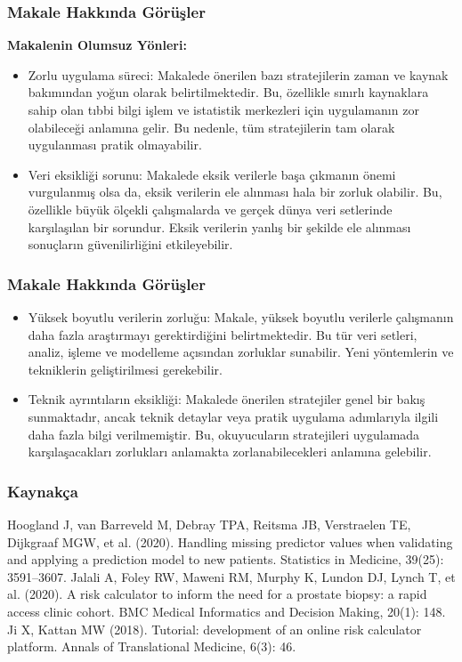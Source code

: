 \documentclass{beamer}
\begin{document}
\begin{frame}
\frametitle{Makale Hakkında Görüşler}
\textbf{Makalenin Olumsuz Yönleri:} 
\begin{itemize}
\item Zorlu uygulama süreci: Makalede önerilen bazı stratejilerin zaman ve kaynak bakımından yoğun olarak belirtilmektedir. Bu, özellikle sınırlı kaynaklara sahip olan tıbbi bilgi işlem ve istatistik merkezleri için uygulamanın zor olabileceği anlamına gelir. Bu nedenle, tüm stratejilerin tam olarak uygulanması pratik olmayabilir.
\item Veri eksikliği sorunu: Makalede eksik verilerle başa çıkmanın önemi vurgulanmış olsa da, eksik verilerin ele alınması hala bir zorluk olabilir. Bu, özellikle büyük ölçekli çalışmalarda ve gerçek dünya veri setlerinde karşılaşılan bir sorundur. Eksik verilerin yanlış bir şekilde ele alınması sonuçların güvenilirliğini etkileyebilir.
\end{itemize}

\end{frame}

\begin{frame}
\frametitle{Makale Hakkında Görüşler}
\begin{itemize}
\item Yüksek boyutlu verilerin zorluğu: Makale, yüksek boyutlu verilerle çalışmanın daha fazla araştırmayı gerektirdiğini belirtmektedir. Bu tür veri setleri, analiz, işleme ve modelleme açısından zorluklar sunabilir. Yeni yöntemlerin ve tekniklerin geliştirilmesi gerekebilir.
\item Teknik ayrıntıların eksikliği: Makalede önerilen stratejiler genel bir bakış sunmaktadır, ancak teknik detaylar veya pratik uygulama adımlarıyla ilgili daha fazla bilgi verilmemiştir. Bu, okuyucuların stratejileri uygulamada karşılaşacakları zorlukları anlamakta zorlanabilecekleri anlamına gelebilir.
\end{itemize}

\end{frame}


\begin{frame}


\frametitle{Kaynakça}

 Hoogland J, van Barreveld M, Debray TPA, Reitsma JB, Verstraelen TE, Dijkgraaf MGW, et al. (2020). Handling missing predictor values when validating and applying a prediction model to new patients. Statistics in Medicine, 39(25): 3591–3607.
\newline
{} Jalali A, Foley RW, Maweni RM, Murphy K, Lundon DJ, Lynch T, et al. (2020). A risk calculator to inform the need for a prostate biopsy: a rapid access clinic cohort. BMC Medical Informatics and Decision Making, 20(1): 148.
\newline
{} Ji X, Kattan MW (2018). Tutorial: development of an online risk calculator platform. Annals of Translational Medicine, 6(3): 46.

\end{frame}
\end{document}

